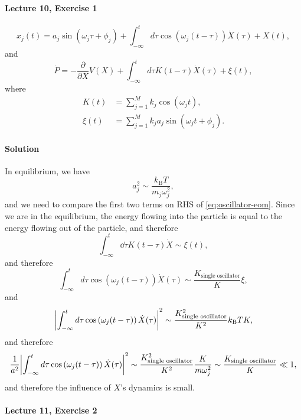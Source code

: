 \documentclass[hyperref, a4paper]{article}
\begin{document}
\paragraph{Lecture 10, Exercise 1}

\begin{equation}
    x_j(t)=a_j \sin \left(\omega_j \tau+\phi_j\right)+\int_{-\infty}^t d \tau \cos \left(\omega_j(t-\tau)\right) \dot{X}(\tau)+X(t),
    \label{eq:oscillator-eom}
\end{equation}
and
\begin{equation}
    \dot{P}=-\frac{\partial}{\partial X} V(X)+\int_{-\infty}^t d \tau K(t-\tau) \dot{X}(\tau)+\xi(t),
\end{equation}
where 
\begin{equation}
    \begin{aligned}
        K(t) &=\sum_{j=1}^M k_j \cos \left(\omega_j t\right), \\
        \xi(t) &=\sum_{j=1}^M k_j a_j \sin \left(\omega_j t+\phi_j\right).
    \end{aligned}
\end{equation}

\paragraph{Solution} In equilibrium, we have 
\begin{equation}
    a_j^2 \sim \frac{k_{\text{B}} T}{m_j \omega_j^2},
\end{equation}
and we need to compare the first two terms on RHS of \eqref{eq:oscillator-eom}.
Since we are in the equilibrium, 
the energy flowing into the particle is equal to the energy flowing out of the particle, and therefore 
\[
    \int_{-\infty}^t \dd{\tau} K(t - \tau) \dot{X} \sim \xi (t), 
\]
and therefore 
\[
    \int_{-\infty}^t d \tau \cos \left(\omega_j(t-\tau)\right) \dot{X}(\tau) \sim 
    \frac{K_{\text{single oscillator}}}{K} \xi,
\]
and 
\[
    \abs{\int_{-\infty}^t d \tau \cos \left(\omega_j(t-\tau)\right) \dot{X}(\tau)}^2 \sim 
    \frac{K_{\text{single oscillator}}^2}{K^2} k_{\text{B}} T K ,
\]
and therefore 
\[
    \frac{1}{a^2}  \abs{\int_{-\infty}^t d \tau \cos \left(\omega_j(t-\tau)\right) \dot{X}(\tau)}^2 \sim
    \frac{K_{\text{single oscillator}}^2}{K^2} \frac{K}{m \omega_j^2}
    \sim \frac{K_{\text{single oscillator}}}{K} \ll 1,
\]
and therefore the influence of $X$'s dynamics is small.

\paragraph{Lecture 11, Exercise 2}
\end{document}
